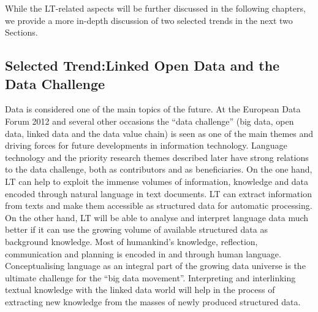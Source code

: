 \documentclass[10pt, plain]{../../metanetpaper}
\begin{document}
\begin{multicols}{2}
While the LT-related aspects will be further discussed in the following chapters, we provide a more in-depth discussion of two selected trends in the next two Sections.

\subsection[Selected Trend: Linked Open Data and the Data Challenge]{Selected Trend:\newline Linked Open Data and the Data Challenge}
\label{sec:linked-data-open}


Data is considered one of the main topics of the future. At the European Data Forum 2012 and several other occasions the ``data challenge'' (big data, open data, linked data and the data value chain) is seen as one of the main themes and driving forces for future developments in information technology. Language technology and the priority research themes described later have strong relations to the data challenge, both as contributors and as beneficiaries. On the one hand, LT can help to exploit the immense volumes of information, knowledge and data encoded through natural language in text documents. LT can extract information from texts and make them accessible as structured data for automatic processing. On the other hand, LT will be able to analyse and interpret language data much better if it can use the growing volume of available structured data as background knowledge. 
%
Most of humankind's knowledge, reflection, communication and planning is encoded in and through human language. Conceptualising language as an integral part of the growing data universe is the ultimate challenge for the “big data movement”. Interpreting and interlinking textual knowledge with the linked data world will help in the process of extracting new knowledge from the masses of newly produced structured data.


\end{multicols}
\end{document}

